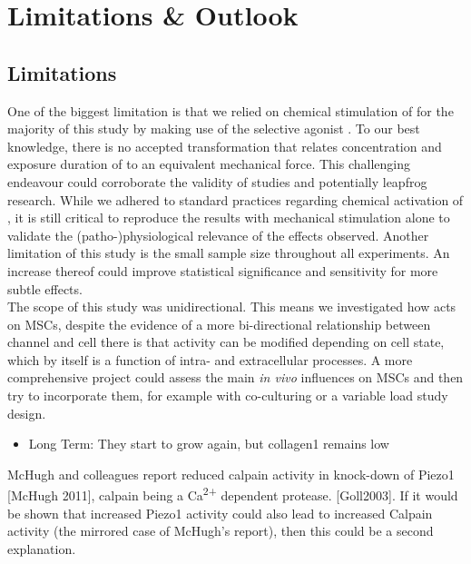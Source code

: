 \chapter{Limitations \& Outlook}

\section{Limitations}
One of the biggest limitation is that we relied on chemical stimulation of \Piezo{} for the majority of this study by making use of the selective \Piezo{} agonist \Yoda{}. To our best knowledge, there is no accepted transformation that relates concentration and exposure duration of \Yoda{} to an equivalent mechanical force. This challenging endeavour could corroborate the validity of \Yoda{} studies and potentially leapfrog \Piezo{} research. While we adhered to standard practices regarding chemical activation of \Piezo{}, it is still critical to reproduce the results with mechanical stimulation alone to validate the (patho-)physiological relevance of the effects observed. 
Another limitation of this study is the small sample size throughout all experiments. An increase thereof could improve statistical significance and sensitivity for more subtle effects.\\
The scope of this study was unidirectional. This means we investigated how \Piezo{} acts on MSCs, despite the evidence of a more bi-directional relationship between channel and cell there is  that \Piezo{} activity can be modified depending on cell state, which by itself is a function of intra- and extracellular processes. A more comprehensive project could assess the main \textit{in vivo} influences on MSCs and then try to incorporate them, for example with co-culturing or a variable load study design.


\begin{itemize}
    \item Long Term: They start to grow again, but collagen1 remains low

\end{itemize}

McHugh and colleagues report reduced calpain activity in knock-down of Piezo1 [McHugh 2011], calpain being a Ca\textsuperscript{2+} dependent protease. [Goll2003]. If it would be shown that increased Piezo1 activity could also lead to increased Calpain activity (the mirrored case of McHugh's report), then this could be a second explanation.